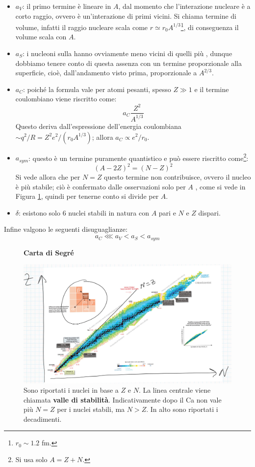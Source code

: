 \begin{itemize}
    \item $a_V$: il primo termine è lineare in $A$, dal momento che l'interazione nucleare è a corto raggio, ovvero è un'interazione di primi vicini. Si chiama termine di volume, infatti il raggio nucleare scala come $r\simeq r_0 A^{1/3}$\footnote{$r_0\sim 1.2$ fm.}, di conseguenza il volume scala con $A$.
    \item $a_S$: i nucleoni sulla  hanno ovviamente meno vicini di quelli più , dunque dobbiamo tenere conto di questa assenza con un termine proporzionale alla superficie, cioè, dall'andamento visto prima, proporzionale a $A^{2/3}$.
    \item $a_C$: poiché la formula vale per atomi pesanti, spesso $Z\gg 1$ e il termine coulombiano viene riscritto come:
    $$a_C \frac{Z^2}{A^{1/3}}$$
    Questo deriva dall'espressione dell'energia coulombiana $\sim q^2/R = Z^2 e^2 / (r_0A^{1/3})$; allora $a_C \propto e^2/r_0$.
    \item $a_{sym}$: questo è un termine puramente quantistico e può essere riscritto come\footnote{Si usa solo $A=Z+N$.}:
    $$(A-2Z)^2 = (N-Z)^2$$
    Si vede allora che per $N=Z$ questo termine non contribuisce, ovvero il nucleo è più stabile; ciò è confermato dalle osservazioni solo per $A$ , come si vede in Figura \ref{segre}, quindi per tenerne conto si divide per $A$.
    \item $\delta$: esistono solo 6 nuclei stabili in natura con $A$ pari e $N$ e $Z$ dispari.
\end{itemize}
\noindent Infine valgono le seguenti disuguaglianze:
$$a_C \lll a_V <a_S < a_{sym}$$

\begin{figure}[h]
    \centering
    \textbf{\Large Carta di Segré}\par\medskip
    \includegraphics[scale=0.21]{Immagini/Segre.png}
    \caption{Sono riportati i nuclei in base a $Z$ e $N$. La linea centrale viene chiamata \textbf{valle di stabilità}. Indicativamente dopo il Ca non vale più $N=Z$ per i nuclei stabili, ma $N>Z$. In alto sono riportati i decadimenti.}
    \label{segre}
\end{figure}

